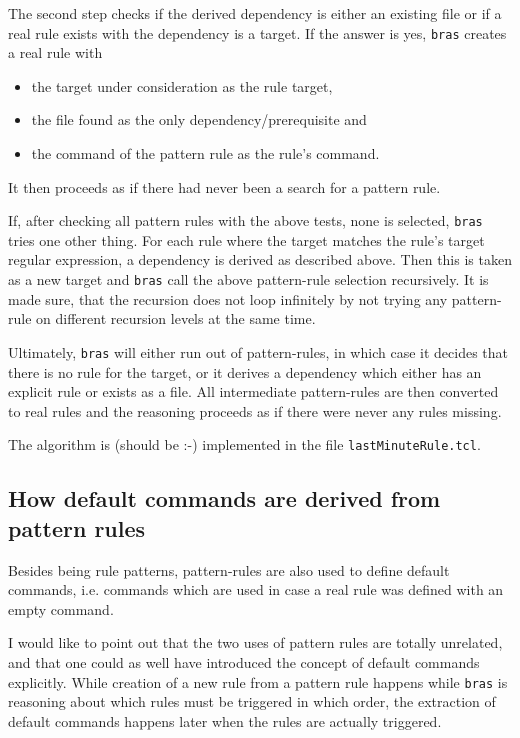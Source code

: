 \documentclass[12pt]{article}
\newcommand{\bras}{\texttt{bras}}
\begin{document}
The second step checks if 
the derived dependency is either an existing file or if a real rule
exists with the dependency is a target.
If the answer is yes, \bras{} creates a real rule with
\begin{itemize}
\item the target under consideration as the rule target,
\item the file found as the only dependency/prerequisite and
\item the command of the pattern rule as the rule's command.
\end{itemize}
It then proceeds as if there had never been a search for a pattern
rule.

If, after checking all pattern rules with the above tests, none is
selected, \bras{} tries one other thing. For each rule where the
target matches the rule's target regular expression, a dependency is
derived as described above. Then this is taken as a new target and
\bras{} call the above pattern-rule selection recursively. It is made
sure, that the recursion does not loop infinitely by not trying any
pattern-rule on different recursion levels at the same time.

Ultimately, \bras{} will either run out of pattern-rules, in which
case it decides that there is no rule for the target, or it derives a
dependency which either has an explicit rule or exists as a file. All
intermediate pattern-rules are then converted to real rules and the
reasoning proceeds as if there were never any rules missing.

The algorithm is (should be :-) implemented in the file
\texttt{lastMinuteRule.tcl}.

\subsection{How default commands are derived from pattern rules}
\label{secSuffixAsDefCmd}
Besides being rule patterns, pattern-rules are also used to define
default commands, i.e. commands which are used in case a real rule was
defined with an empty command.

I would like to point out that the two uses of pattern rules are
totally unrelated, and that one could as well have introduced the
concept of default commands explicitly. While creation of a new rule
from a pattern rule happens while \bras{} is reasoning about which rules
must be triggered in which order, the extraction of default commands
happens later when the rules are actually triggered. 
\end{document}
